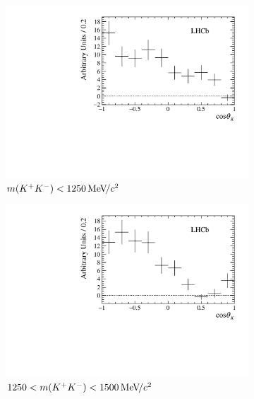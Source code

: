 \begin{figure}[!h]
    \centering
    \begin{subfigure}[t]{0.49\textwidth}
        \includegraphics[width=1.0\textwidth]{figs/B2DsKK/helAngle_bin1_sweighted.pdf}
        \caption{$m({{K}^+}{{K}^-})<1250{\mathrm{\,Me\kern -0.1em V\!/}c^2}$}
    \end{subfigure}
    \begin{subfigure}[t]{0.49\textwidth}
        \includegraphics[width=1.0\textwidth]{figs/B2DsKK/helAngle_bin2_sweighted.pdf}
        \caption{$1250<m({{K}^+}{{K}^-})<1500{\mathrm{\,Me\kern -0.1em V\!/}c^2}$}
    \end{subfigure}
    \begin{subfigure}[t]{0.49\textwidth}

\end{subfigure}
\end{figure}
